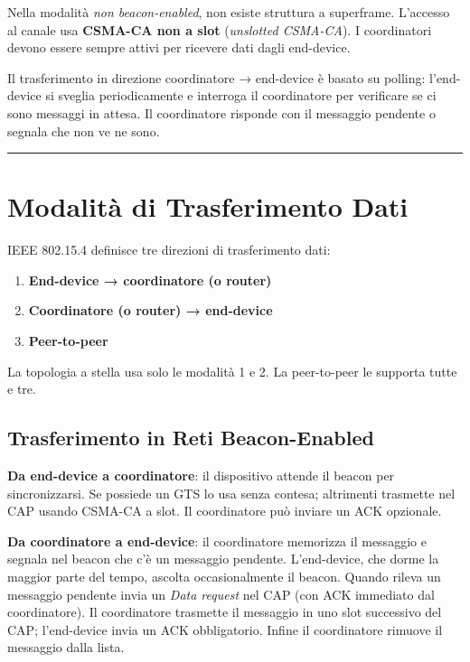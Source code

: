 \documentclass[
  italian,
  openany]{book}
\providecommand{\tightlist}{%
  \setlength{\itemsep}{0pt}\setlength{\parskip}{0pt}}
\begin{document}
Nella modalità \emph{non beacon-enabled}, non esiste struttura a
superframe. L'accesso al canale usa \textbf{CSMA-CA non a slot}
(\emph{unslotted CSMA-CA}). I coordinatori devono essere sempre attivi
per ricevere dati dagli end-device.

Il trasferimento in direzione coordinatore → end-device è basato su
polling: l'end-device si sveglia periodicamente e interroga il
coordinatore per verificare se ci sono messaggi in attesa. Il
coordinatore risponde con il messaggio pendente o segnala che non ve ne
sono.

\begin{center}\rule{0.5\linewidth}{0.5pt}\end{center}

\section{Modalità di Trasferimento
Dati}\label{modalituxe0-di-trasferimento-dati}

IEEE 802.15.4 definisce tre direzioni di trasferimento dati:

\begin{enumerate}
\def\labelenumi{\arabic{enumi}.}
\tightlist
\item
  \textbf{End-device → coordinatore (o router)}
\item
  \textbf{Coordinatore (o router) → end-device}
\item
  \textbf{Peer-to-peer}
\end{enumerate}

La topologia a stella usa solo le modalità 1 e 2. La peer-to-peer le
supporta tutte e tre.

\subsection{Trasferimento in Reti
Beacon-Enabled}\label{trasferimento-in-reti-beacon-enabled}

\textbf{Da end-device a coordinatore}: il dispositivo attende il beacon
per sincronizzarsi. Se possiede un GTS lo usa senza contesa; altrimenti
trasmette nel CAP usando CSMA-CA a slot. Il coordinatore può inviare un
ACK opzionale.

\textbf{Da coordinatore a end-device}: il coordinatore memorizza il
messaggio e segnala nel beacon che c'è un messaggio pendente.
L'end-device, che dorme la maggior parte del tempo, ascolta
occasionalmente il beacon. Quando rileva un messaggio pendente invia un
\emph{Data request} nel CAP (con ACK immediato dal coordinatore). Il
coordinatore trasmette il messaggio in uno slot successivo del CAP;
l'end-device invia un ACK obbligatorio. Infine il coordinatore rimuove
il messaggio dalla lista.
\end{document}
